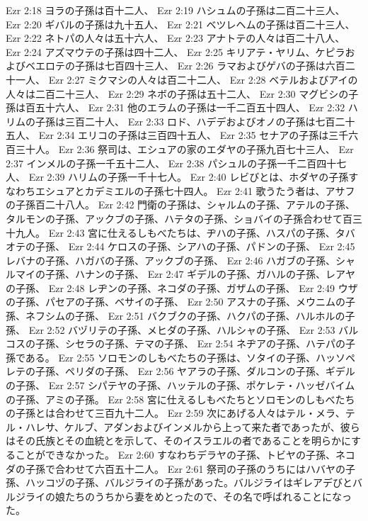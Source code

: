 Ezr 2:18  ヨラの子孫は百十二人、
Ezr 2:19  ハシュムの子孫は二百二十三人、
Ezr 2:20  ギバルの子孫は九十五人、
Ezr 2:21  ベツレヘムの子孫は百二十三人、
Ezr 2:22  ネトパの人々は五十六人、
Ezr 2:23  アナトテの人々は百二十八人、
Ezr 2:24  アズマウテの子孫は四十二人、
Ezr 2:25  キリアテ・ヤリム、ケピラおよびベエロテの子孫は七百四十三人、
Ezr 2:26  ラマおよびゲバの子孫は六百二十一人、
Ezr 2:27  ミクマシの人々は百二十二人、
Ezr 2:28  ベテルおよびアイの人々は二百二十三人、
Ezr 2:29  ネボの子孫は五十二人、
Ezr 2:30  マグビシの子孫は百五十六人、
Ezr 2:31  他のエラムの子孫は一千二百五十四人、
Ezr 2:32  ハリムの子孫は三百二十人、
Ezr 2:33  ロド、ハデデおよびオノの子孫は七百二十五人、
Ezr 2:34  エリコの子孫は三百四十五人、
Ezr 2:35  セナアの子孫は三千六百三十人。
Ezr 2:36  祭司は、エシュアの家のエダヤの子孫九百七十三人、
Ezr 2:37  インメルの子孫一千五十二人、
Ezr 2:38  パシュルの子孫一千二百四十七人、
Ezr 2:39  ハリムの子孫一千十七人。
Ezr 2:40  レビびとは、ホダヤの子孫すなわちエシュアとカデミエルの子孫七十四人。
Ezr 2:41  歌うたう者は、アサフの子孫百二十八人。
Ezr 2:42  門衛の子孫は、シャルムの子孫、アテルの子孫、タルモンの子孫、アックブの子孫、ハテタの子孫、ショバイの子孫合わせて百三十九人。
Ezr 2:43  宮に仕えるしもべたちは、ヂハの子孫、ハスパの子孫、タバオテの子孫、
Ezr 2:44  ケロスの子孫、シアハの子孫、パドンの子孫、
Ezr 2:45  レバナの子孫、ハガバの子孫、アックブの子孫、
Ezr 2:46  ハガブの子孫、シャルマイの子孫、ハナンの子孫、
Ezr 2:47  ギデルの子孫、ガハルの子孫、レアヤの子孫、
Ezr 2:48  レヂンの子孫、ネコダの子孫、ガザムの子孫、
Ezr 2:49  ウザの子孫、パセアの子孫、ベサイの子孫、
Ezr 2:50  アスナの子孫、メウニムの子孫、ネフシムの子孫、
Ezr 2:51  バクブクの子孫、ハクパの子孫、ハルホルの子孫、
Ezr 2:52  バヅリテの子孫、メヒダの子孫、ハルシャの子孫、
Ezr 2:53  バルコスの子孫、シセラの子孫、テマの子孫、
Ezr 2:54  ネヂアの子孫、ハテパの子孫である。
Ezr 2:55  ソロモンのしもべたちの子孫は、ソタイの子孫、ハッソペレテの子孫、ペリダの子孫、
Ezr 2:56  ヤアラの子孫、ダルコンの子孫、ギデルの子孫、
Ezr 2:57  シパテヤの子孫、ハッテルの子孫、ポケレテ・ハッゼバイムの子孫、アミの子孫。
Ezr 2:58  宮に仕えるしもべたちとソロモンのしもべたちの子孫とは合わせて三百九十二人。
Ezr 2:59  次にあげる人々はテル・メラ、テル・ハレサ、ケルブ、アダンおよびインメルから上って来た者であったが、彼らはその氏族とその血統とを示して、そのイスラエルの者であることを明らかにすることができなかった。
Ezr 2:60  すなわちデラヤの子孫、トビヤの子孫、ネコダの子孫で合わせて六百五十二人。
Ezr 2:61  祭司の子孫のうちにはハバヤの子孫、ハッコヅの子孫、バルジライの子孫があった。バルジライはギレアデびとバルジライの娘たちのうちから妻をめとったので、その名で呼ばれることになった。
